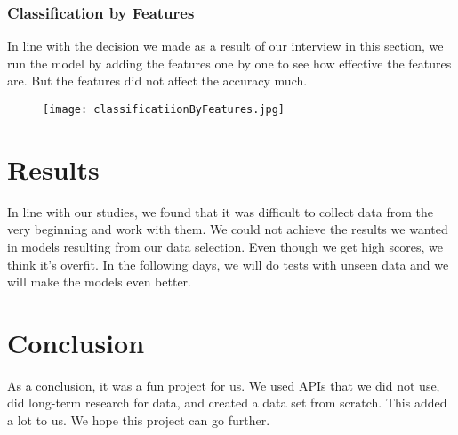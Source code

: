 \documentclass[]{article}
\begin{document}
\subsubsection{Classification by Features}
In line with the decision we made as a result of our interview in this section, we run the model by adding the features one by one to see how effective the features are. But the features did not affect the accuracy much.
\begin{figure}[h]
    \centering
    \texttt{[image: classificatiionByFeatures.jpg]}
\end{figure}
\section{Results}
In line with our studies, we found that it was difficult to collect data from the very beginning and work with them. We could not achieve the results we wanted in models resulting from our data selection. Even though we get high scores, we think it's overfit. In the following days, we will do tests with unseen data and we will make the models even better.
\section{Conclusion}
As a conclusion, it was a fun project for us. We used APIs that we did not use, did long-term research for data, and created a data set from scratch. This added a lot to us. We hope this project can go further.
\end{document}
